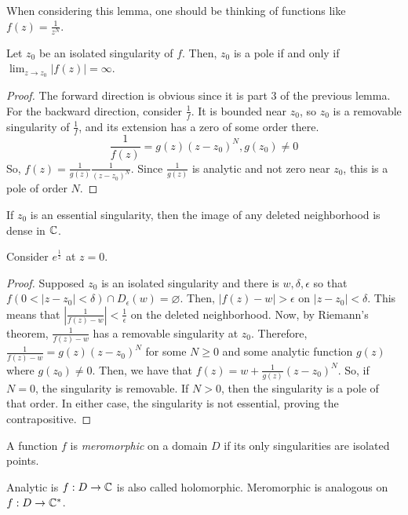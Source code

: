 \documentclass[11pt,leqno,oneside]{amsart}
\numberwithin{thm}{section}
\begin{document}
  When considering this lemma, one should be thinking of functions
  like $f(z) = \frac{1}{z^N}$.
  \begin{prop}
    Let $z_0$ be an isolated singularity of $f$. Then, $z_0$ is a pole
    if and only if $\lim_{z\to z_0} |f(z)| = \infty$.
  \end{prop}
  \begin{proof}
    The forward direction is obvious since it is part 3 of the
    previous lemma. For the backward direction, consider
    $\frac{1}{f}$. It is bounded near $z_0$, so $z_0$ is a removable
    singularity of $\frac{1}{f}$, and its extension has a zero of some
    order there. \[
      \frac{1}{f(z)} = g(z)(z-z_0)^N, g(z_0) \neq 0
    \]
    So, $f(z) = \frac{1}{g(z)}\frac{1}{(z-z_0)^N}$. Since
    $\frac{1}{g(z)}$ is analytic and not zero near $z_0$, this is a
    pole of order $N$.
  \end{proof}
  \begin{thm}
    If $z_0$ is an essential singularity, then the image of any
    deleted neighborhood is dense in ${\mathbb C}$.
  \end{thm}
  \begin{example}
    Consider $e^{\frac{1}{z}}$ at $z=0$.
  \end{example}
  \begin{proof}
    Supposed $z_0$ is an isolated singularity and there is
    $w,\delta,\epsilon$ so that $f(0 < |z-z_0| < \delta) \cap
    D_\epsilon(w) = \varnothing$. Then, $|f(z)-w| > \epsilon$ on
    $|z-z_0| < \delta$. This means that $\left| \frac{1}{f(z)-w}
    \right| < \frac{1}{\epsilon}$ on the deleted neighborhood. Now, by
    Riemann's theorem, $\frac{1}{f(z)-w}$ has a removable singularity
    at $z_0$. Therefore, $\frac{1}{f(z)-w} = g(z)(z-z_0)^N$ for some
    $N \geq 0$ and some analytic function $g(z)$ where $g(z_0) \neq
    0$. Then, we have that $f(z) = w + \frac{1}{g(z)}(z-z_0)^N$. So,
    if $N=0$, the singularity is removable. If $N > 0$, then the
    singularity is a pole of that order. In either case, the
    singularity is not essential, proving the contrapositive.
  \end{proof}
  \begin{defn}
    A function $f$ is \emph{meromorphic} on a domain $D$ if its only
    singularities are isolated points.
  \end{defn}
  Analytic is $f: D \to {\mathbb C}$ is also called holomorphic. Meromorphic is
  analogous on $f: D \to {\mathbb C}^*$.
\end{document}
